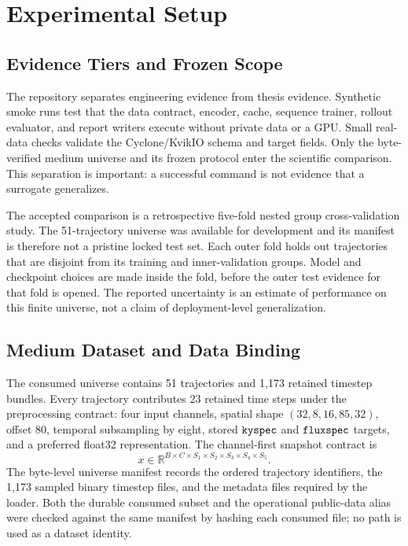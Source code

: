 \cleardoubleoddpage
\chapter{Experimental Setup}
\label{chap:experiments}

\section{Evidence Tiers and Frozen Scope}

The repository separates engineering evidence from thesis evidence. Synthetic smoke runs test
that the data contract, encoder, cache, sequence trainer, rollout evaluator, and report writers
execute without private data or a GPU. Small real-data checks validate the Cyclone/KvikIO schema
and target fields. Only the byte-verified medium universe and its frozen protocol enter the
scientific comparison. This separation is important: a successful command is not evidence that a
surrogate generalizes.

The accepted comparison is a retrospective five-fold nested group cross-validation study. The
51-trajectory universe was available for development and its manifest is therefore not a pristine
locked test set. Each outer fold holds out trajectories that are disjoint from its training and
inner-validation groups. Model and checkpoint choices are made inside the fold, before the outer
test evidence for that fold is opened. The reported uncertainty is an estimate of performance on
this finite universe, not a claim of deployment-level generalization.

\section{Medium Dataset and Data Binding}

The consumed universe contains 51 trajectories and 1,173 retained timestep bundles. Every
trajectory contributes 23 retained time steps under the preprocessing contract: four input
channels, spatial shape $(32,8,16,85,32)$, offset 80, temporal subsampling by eight, stored
$\texttt{kyspec}$ and $\texttt{fluxspec}$ targets, and a preferred float32 representation. The
channel-first snapshot contract is
\begin{equation}
  x \in \mathbb{R}^{B\times C\times S_1\times S_2\times S_3\times S_4\times S_5}.
\end{equation}
The byte-level universe manifest records the ordered trajectory identifiers, the 1,173 sampled
binary timestep files, and the metadata files required by the loader. Both the durable consumed
subset and the operational public-data alias were checked against the same manifest by hashing
each consumed file; no path is used as a dataset identity.

